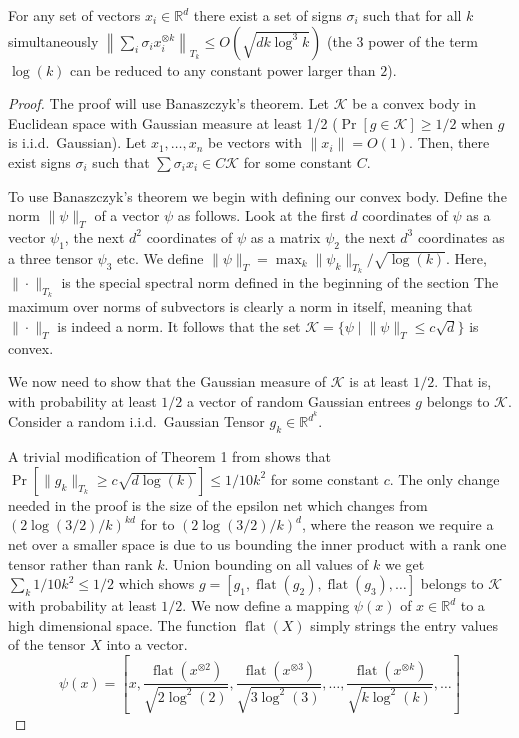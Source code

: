 \documentclass[anon,12pt]{colt2019} %
\newcommand{\R}{\mathbb{R}}
\renewcommand{\Pr}{\operatorname{Pr}}
\begin{document}
\begin{lemma}\label{uc}
For any set of vectors $x_i \in \R^d$ there exist a set of signs $\sigma_i$ such that for all $k$ simultaneously $\left\| \sum_i \sigma_i x_i^{\otimes k} \right\|_{T_k} \le O(\sqrt{d k\log^{3}{k}})$ (the $3$ power of the term $\log(k)$ can be reduced to any constant power larger than $2$). 
\end{lemma}
\begin{proof}
The proof will use Banaszczyk's theorem. 
Let $\mathcal K$ be a convex body in Euclidean space with Gaussian measure at least 1/2 ($\Pr[g \in \mathcal K] \ge 1/2$ when $g$ is i.i.d.\ Gaussian).
Let $x_1,\ldots,x_n$ be vectors with $\|x_i\| =O(1)$. 
Then, there exist signs $\sigma_i$ such that $\sum \sigma_i x_i \in C \mathcal K$ for some constant $C$.

To use Banaszczyk's theorem we begin with defining our convex body.
Define the norm $\|\psi\|_T$ of a vector $\psi$ as follows. Look at the first $d$ coordinates of $\psi$ as a vector $\psi_1$, the next $d^2$ coordinates of $\psi$ as a matrix $\psi_2$ the next $d^3$ coordinates as a three tensor $\psi_3$ etc.
We define $\|\psi\|_T = \max_k \|\psi_k\|_{T_k} /\sqrt{\log(k)}$. 
Here, $\|\cdot\|_{T_k}$ is the special spectral norm defined in the beginning of the section 
The maximum over norms of subvectors is clearly a norm in itself, meaning that $\|\cdot \|_T$ is indeed a norm. It follows that  the set $\mathcal K  = \{\psi \; | \; \|\psi\|_T \le c\sqrt{d}\}$ is convex. 

We now need to show that the Gaussian measure of $\mathcal K$ is at least $1/2$. 
That is, with probability at least $1/2$ a vector of random Gaussian entrees $g$ belongs to $\mathcal K$.
Consider a random i.i.d.\ Gaussian Tensor $g_k \in \R^{d^k}$. 

A trivial modification of Theorem 1 from \cite{tomioka2014spectral} shows that $\Pr[\|g_k\|_{T_k} \ge c\sqrt{d\log(k)}] \le 1/10k^2$ for some constant $c$. The only change needed in the proof is the size of the epsilon net which changes from $(2\log(3/2)/k)^{kd}$ for \cite{tomioka2014spectral} to $(2\log(3/2)/k)^d$, where the reason we require a net over a smaller space is due to us bounding the inner product with a rank one tensor rather than rank $k$. Union bounding on all values of $k$ we get $\sum_k 1/10k^2 \le 1/2$ which shows $g = [g_1, \operatorname{flat}(g_2), \operatorname{flat}(g_3), \ldots]$ belongs to $\mathcal K$ with probability at least $1/2$. 
%
We now define a mapping $\psi(x)$ of $x\in \R^d$ to a high dimensional space. The function $\operatorname{flat}(X)$ simply strings the entry values of the tensor $X$ into a vector.
$$\psi(x) = [x, \frac{\operatorname{flat}(x^{\otimes 2})}{\sqrt{2\log^2(2)}}, \frac{\operatorname{flat}(x^{\otimes 3})}{\sqrt{3\log^2(3)}}, \ldots,\frac{\operatorname{flat}(x^{\otimes k})}{\sqrt{k\log^2(k)}},\ldots]$$


\end{proof}
\end{document}
